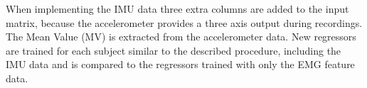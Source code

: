 When implementing the IMU data three extra columns are added to the input matrix, because the accelerometer provides a three axis output during recordings. The Mean Value (MV) is extracted from the accelerometer data. New regressors are trained for each subject similar to the described procedure, including the IMU data and is compared to the regressors trained with only the EMG feature data. 


%
%
%
%
%
%
%
%
%
%
